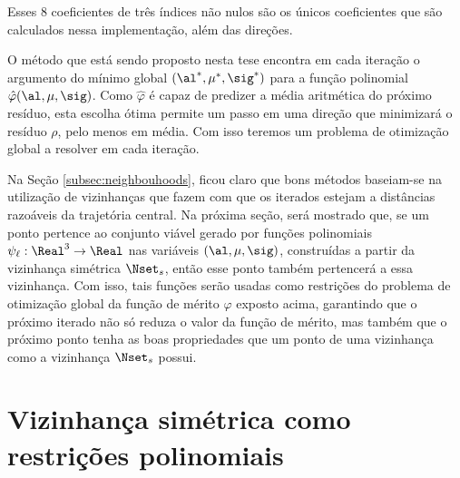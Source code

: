 Esses 8 
coeficientes de três índices  não nulos são
os únicos coeficientes que são calculados nessa implementação, além das
direções.

% 



O método que está sendo proposto nesta tese encontra em cada iteração o
argumento do mínimo global $(\al^*,\mu^*,\sig^*)$ para a função polinomial
 $\hat{\varphi}(\al,\mu,\sig)$. Como $\hat{\varphi}$ é capaz de predizer a média
 aritmética do próximo resíduo, esta escolha ótima permite um passo em uma
 direção que minimizará  o resíduo $\rho$, pelo menos em média. Com isso
 teremos um problema de otimização global a resolver em cada iteração.
 
 
 Na Seção \ref{subsec:neighbouhoods}, ficou claro que bons métodos baseiam-se na
  utilização de vizinhanças que fazem com que os iterados estejam a distâncias
  razoáveis da trajetória central. Na próxima seção, será mostrado que, se um
  ponto pertence ao conjunto viável gerado por funções polinomiais
  $\psi_\ell:\Real^3\to\Real$ nas variáveis $(\al,\mu,\sig)$, construídas a
  partir da vizinhança simétrica $\Nset_s$, então esse ponto  também pertencerá
  a essa vizinhança.
  Com isso, tais funções serão usadas como restrições do problema de otimização
  global da função de mérito $\varphi$ exposto acima, garantindo que o próximo
  iterado não só reduza o valor da função de mérito, mas também que o próximo
  ponto tenha as boas propriedades que um ponto de uma vizinhança como a
  vizinhança $\Nset_s$ possui.
  
  
\section{Vizinhança simétrica como restrições polinomiais}


